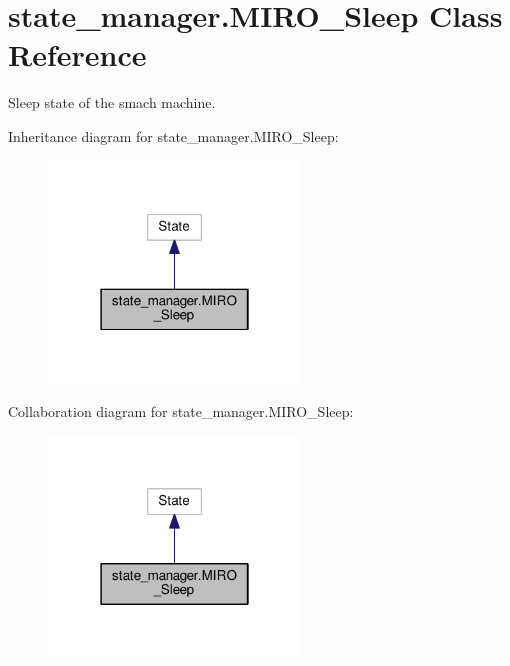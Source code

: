 \hypertarget{classstate__manager_1_1MIRO__Sleep}{}\section{state\+\_\+manager.\+M\+I\+R\+O\+\_\+\+Sleep Class Reference}
\label{classstate__manager_1_1MIRO__Sleep}


Sleep state of the smach machine.  




Inheritance diagram for state\+\_\+manager.\+M\+I\+R\+O\+\_\+\+Sleep\+:\nopagebreak
\begin{figure}[H]
\begin{center}
\leavevmode
\includegraphics[width=190pt]{classstate__manager_1_1MIRO__Sleep__inherit__graph}
\end{center}
\end{figure}


Collaboration diagram for state\+\_\+manager.\+M\+I\+R\+O\+\_\+\+Sleep\+:\nopagebreak
\begin{figure}[H]
\begin{center}
\leavevmode
\includegraphics[width=190pt]{classstate__manager_1_1MIRO__Sleep__coll__graph}
\end{center}
\end{figure}
